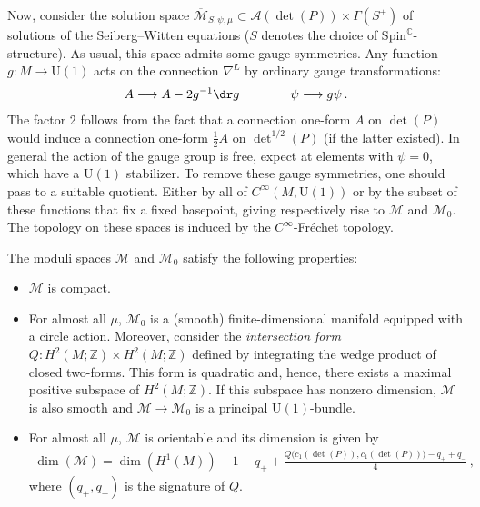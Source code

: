     Now, consider the solution space $\overline{\mathcal{M}}_{S,\psi,\mu}\subset\mathcal{A}(\det(P))\times\Gamma(S^+)$ of solutions of the Seiberg--Witten equations ($S$ denotes the choice of $\mathrm{Spin}^{\mathbb{C}}$-structure). As usual, this space admits some gauge symmetries. Any function $g:M\rightarrow\mathrm{U}(1)$ acts on the connection $\nabla^L$ by ordinary gauge transformations:
    \begin{gather}
        A\longrightarrow A-2g^{-1}\dr g\qquad\qquad\psi\longrightarrow g\psi\,.
    \end{gather}
    The factor 2 follows from the fact that a connection one-form $A$ on $\det(P)$ would induce a connection one-form $\frac{1}{2}A$ on $\det^{1/2}(P)$ (if the latter existed). In general the action of the gauge group is free, expect at elements with $\psi=0$, which have a $\mathrm{U}(1)$ stabilizer. To remove these gauge symmetries, one should pass to a suitable quotient. Either by all of $C^\infty(M,\mathrm{U}(1))$ or by the subset of these functions that fix a fixed basepoint, giving respectively rise to $\mathcal{M}$ and $\mathcal{M}_0$. The topology on these spaces is induced by the $C^\infty$-Fr\'echet topology.

    \begin{property}
        The moduli spaces $\mathcal{M}$ and $\mathcal{M}_0$ satisfy the following properties:
        \begin{itemize}
            \item $\mathcal{M}$ is compact.
            \item For almost all $\mu$, $\mathcal{M}_0$ is a (smooth) finite-dimensional manifold equipped with a circle action. Moreover, consider the \textit{intersection form} $Q:H^2(M;\mathbb{Z})\times H^2(M;\mathbb{Z})$ defined by integrating the wedge product of closed two-forms. This form is quadratic and, hence, there exists a maximal positive subspace of $H^2(M;\mathbb{Z})$. If this subspace has nonzero dimension, $\mathcal{M}$ is also smooth and $\mathcal{M}\rightarrow\mathcal{M}_0$ is a principal $\mathrm{U}(1)$-bundle.
            \item For almost all $\mu$, $\mathcal{M}$ is orientable and its dimension is given by
                \begin{gather}
                    \dim(\mathcal{M}) = \dim(H^1(M)) - 1 - q_+ + \frac{Q\bigl(c_1(\det(P)),c_1(\det(P))\bigr)-q_++q_-}{4}\,,
                \end{gather}
                where $(q_+,q_-)$ is the signature of $Q$.
        \end{itemize}
    \end{property}

